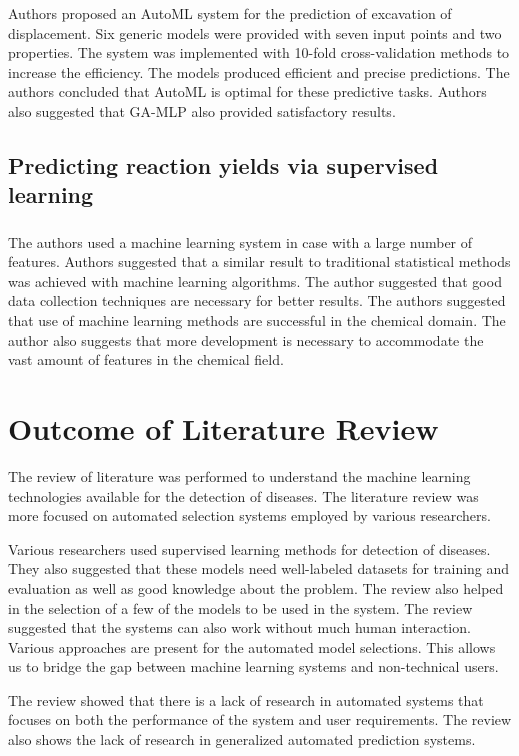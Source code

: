 Authors proposed an AutoML system for the prediction of excavation of displacement. Six generic models were provided with seven input points and two properties. The system was implemented with 10-fold cross-validation methods to increase the efficiency. The models produced efficient and precise predictions. The authors concluded that AutoML is optimal for these predictive tasks. Authors also suggested that GA-MLP also provided satisfactory results.

\subsection{Predicting reaction yields via supervised learning}
\subsubsection{\citeauthor*{ref_paper_10} \citeyearpar{ref_paper_10}}

The authors used a machine learning system in case with a large number of features. Authors suggested that a similar result to traditional statistical methods was achieved with machine learning algorithms. The author suggested that good data collection techniques are necessary for better results. The authors suggested that use of machine learning methods are successful in the chemical domain. The author also suggests that more development is necessary to accommodate the vast amount of features in the chemical field.

\section{Outcome of Literature Review} \label{sec:outcome _of_literature_review}

The review of literature was performed to understand the machine learning technologies available for the detection of diseases. The literature review was more focused on automated selection systems employed by various researchers.

Various researchers used supervised learning methods for detection of diseases. They also suggested that these models need well-labeled datasets for training and evaluation as well as good knowledge about the problem. The review also helped in the selection of a few of the models to be used in the system. The review suggested that the systems can also work without much human interaction. Various approaches are present for the automated model selections. This allows us to bridge the gap between machine learning systems and non-technical users.

The review showed that there is a lack of research in automated systems that focuses on both the performance of the system and user requirements. The review also shows the lack of research in generalized automated prediction systems.

